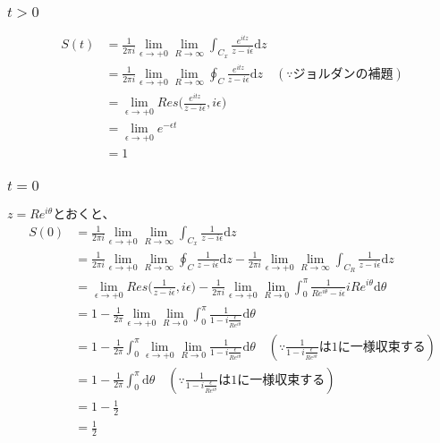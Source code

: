 \documentclass[dvipdfmx,a4paper]{jsarticle}
\begin{document}
 \subsubsection{$t >0$}
 \begin{align*}
 S(t) &= \frac{1}{2\pi i}\lim_{\epsilon \to +0}\lim_{R\to \infty}\int_{C_x}\frac{e^{itz}}{z - i\epsilon}\mathrm{d}z\\
 &= \frac{1}{2\pi i}\lim_{\epsilon \to +0}\lim_{R\to \infty}\oint_{C}\frac{e^{itz}}{z - i\epsilon}\mathrm{d}z\quad(\because ジョルダンの補題)\\
 &=  \lim_{\epsilon \to +0}Res\biggl(\frac{e^{itz}}{z - i\epsilon}, i\epsilon\biggr)\\
 &=  \lim_{\epsilon \to +0}e^{-\epsilon t} \\
 &= 1
 \end{align*}
 
 \subsubsection{$t = 0$}
 $z = Re^{i\theta}$とおくと、
 \begin{align*}
 S(0) &= \frac{1}{2\pi i}\lim_{\epsilon \to +0}\lim_{R\to \infty}\int_{C_x}\frac{1}{z - i\epsilon}\mathrm{d}z\\
 &= \frac{1}{2\pi i}\lim_{\epsilon \to +0}\lim_{R\to \infty}\oint_{C}\frac{1}{z - i\epsilon}\mathrm{d}z - \frac{1}{2\pi i}\lim_{\epsilon \to +0}\lim_{R\to \infty}\int_{C_R}\frac{1}{z - i\epsilon}\mathrm{d}z\\
 &=  \lim_{\epsilon \to +0}Res\biggl(\frac{1}{z - i\epsilon}, i\epsilon\biggr) - \frac{1}{2\pi i}\lim_{\epsilon \to +0}\lim_{R\to 0}\int_{0}^{\pi}\frac{1}{Re^{i\theta} - i\epsilon}iRe^{i\theta}\mathrm{d}\theta\\
 &= 1 - \frac{1}{2\pi }\lim_{\epsilon \to +0}\lim_{R\to 0}\int_{0}^{\pi}\frac{1}{1 - i\frac{\epsilon}{Re^{i\theta}}}\mathrm{d}\theta\\
 &= 1 - \frac{1}{2\pi }\int_{0}^{\pi}\lim_{\epsilon \to +0}\lim_{R\to 0}\frac{1}{1 - i\frac{\epsilon}{Re^{i\theta}}}\mathrm{d}\theta\quad(\because\frac{1}{1 - i\frac{\epsilon}{Re^{i\theta}}}は1に一様収束する)\\
 &= 1 - \frac{1}{2\pi }\int_{0}^{\pi}\mathrm{d}\theta\quad(\because\frac{1}{1 - i\frac{\epsilon}{Re^{i\theta}}}は1に一様収束する)\\
 &= 1-\frac{1}{2}\\
 &= \frac{1}{2}
 \end{align*}
 
\end{document}
